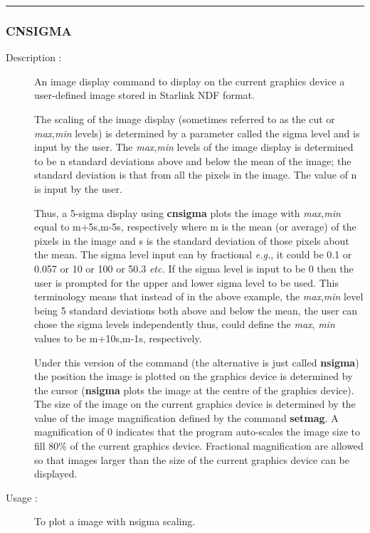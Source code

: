 \hrule
\subsubsection*{\label{CNSIGMA}CNSIGMA}

\begin{description}

\item[Description :] An image display command to display on the current
graphics device a user-defined image stored in Starlink NDF format.

The scaling of the image display (sometimes referred to as the cut or
{\it max},{\it min} levels) is determined by a parameter called the
sigma level and is input by the user.  The {\it max},{\it min} levels
of the image display is determined to be n standard deviations above
and below the mean of the image; the standard deviation is that from
all the pixels in the image.  The value of n is input by the user.

Thus, a 5-sigma display using {\bf cnsigma} plots the image with {\it
max},{\it min} equal to m+5s,m-5s, respectively where m is the mean (or
average) of the pixels in the image and s is the standard deviation of
those pixels about the mean.  The sigma level input can by fractional
\emph{e.g.}, it could be 0.1 or 0.057 or 10 or 100 or 50.3 \emph{etc.}
If the sigma level is input to be 0 then the user is prompted for the
upper and lower sigma level to be used. This terminology means that
instead of in the above example, the {\it max},{\it min} level being 5
standard deviations both above and below the mean, the user can chose
the sigma levels independently thus, could define the {\it max},{\it
min} values to be m+10s,m-1s, respectively.

Under this version of the command (the alternative is just called {\bf
nsigma}) the position the image is plotted on the graphics device is
determined by the cursor ({\bf nsigma} plots the image at the centre of
the graphics device).  The size of the image on the current graphics
device is determined by the value of the image magnification defined by
the command {\bf setmag}.  A magnification of 0 indicates that the
program auto-scales the image size to fill 80\% of the current graphics
device.  Fractional magnification are allowed so that images larger
than the size of the current graphics device can be displayed.

\item[Usage :] To plot a image with nsigma scaling.


\end{description}
